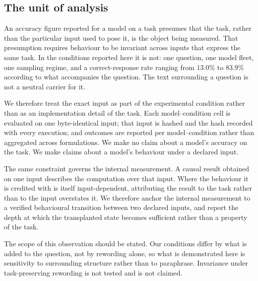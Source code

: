 \subsection{The unit of analysis}
\label{sec:design-unit}

An accuracy figure reported for a model on a task presumes that the task, rather than
the particular input used to pose it, is the object being measured. That presumption
requires behaviour to be invariant across inputs that express the same task. In the
conditions reported here it is not: one question, one model fleet, one sampling
regime, and a correct-response rate ranging from $13.0\%$ to $83.9\%$ according to what
accompanies the question. The text surrounding a question is not a neutral carrier
for it.

We therefore treat the exact input as part of the experimental condition rather than
as an implementation detail of the task. Each model--condition cell is evaluated on
one byte-identical input; that input is hashed and the hash recorded with every
execution; and outcomes are reported per model--condition rather than aggregated
across formulations. We make no claim about a model's accuracy on the task. We make
claims about a model's behaviour under a declared input.

The same constraint governs the internal measurement. A causal result obtained on one
input describes the computation over that input. Where the behaviour it is credited
with is itself input-dependent, attributing the result to the task rather than to the
input overstates it. We therefore anchor the internal measurement to a verified
behavioural transition between two declared inputs, and report the depth at which the
transplanted state becomes sufficient rather than a property of the task.

The scope of this observation should be stated. Our conditions differ by what is
added to the question, not by rewording alone, so what is demonstrated here is
sensitivity to surrounding structure rather than to paraphrase. Invariance under
task-preserving rewording is not tested and is not claimed.
